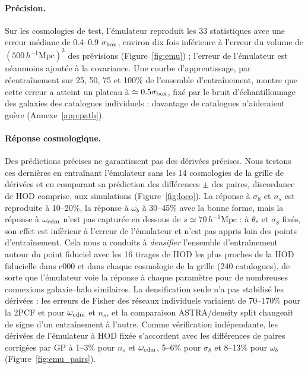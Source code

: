 \documentclass[11pt,twocolumn]{article}
\newcommand{\Mpch}{\,h^{-1}\mathrm{Mpc}}
\begin{document}
\paragraph{Précision.} Sur les cosmologies de test, l'émulateur reproduit les 33 statistiques avec une erreur médiane de 0.4--0.9 $\sigma_{\rm box}$, environ dix fois inférieure à l'erreur du volume de $(500\Mpch)^3$ des prévisions (Figure~\ref{fig:emu}) ; l'erreur de l'émulateur est néanmoins ajoutée à la covariance. Une courbe d'apprentissage, par réentraînement sur 25, 50, 75 et 100\% de l'ensemble d'entraînement, montre que cette erreur a atteint un plateau à $\simeq0.5\sigma_{\rm box}$, fixé par le bruit d'échantillonnage des galaxies des catalogues individuels : davantage de catalogues n'aideraient guère (Annexe~\ref{app:path}).

\paragraph{Réponse cosmologique.} Des prédictions précises ne garantissent pas des dérivées précises. Nous testons ces dernières en entraînant l'émulateur sans les 14 cosmologies de la grille de dérivées et en comparant sa prédiction des différences $\pm$ des paires, discordance de HOD comprise, aux simulations (Figure~\ref{fig:loco}). La réponse à $\sigma_8$ et $n_s$ est reproduite à 10--20\%, la réponse à $\omega_b$ à 30--45\% avec la bonne forme, mais la réponse à $\omega_{\rm cdm}$ n'est pas capturée en dessous de $s\simeq70\Mpch$ : à $\theta_*$ et $\sigma_8$ fixés, son effet est inférieur à l'erreur de l'émulateur et n'est pas appris loin des points d'entraînement. Cela nous a conduits à \emph{densifier} l'ensemble d'entraînement autour du point fiduciel avec les 16 tirages de HOD les plus proches de la HOD fiducielle dans c000 et dans chaque cosmologie de la grille (240 catalogues), de sorte que l'émulateur voie la réponse à chaque paramètre pour de nombreuses connexions galaxie--halo similaires. La densification seule n'a pas stabilisé les dérivées : les erreurs de Fisher des réseaux individuels variaient de 70--170\% pour la 2PCF et pour $\omega_{\rm cdm}$ et $n_s$, et la comparaison ASTRA/density split changeait de signe d'un entraînement à l'autre. Comme vérification indépendante, les dérivées de l'émulateur à HOD fixée s'accordent avec les différences de paires corrigées par GP à 1--3\% pour $n_s$ et $\omega_{\rm cdm}$, 5--6\% pour $\sigma_8$ et 8--13\% pour $\omega_b$ (Figure~\ref{fig:emu_pairs}).
\end{document}

